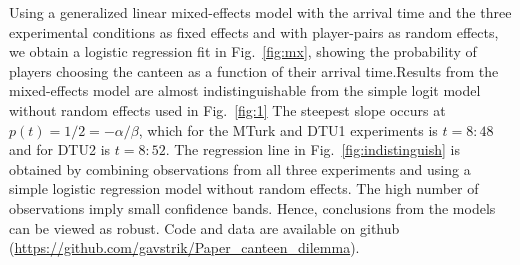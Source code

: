 \documentclass[twocolumn,a4paper,superscriptaddress,nofootinbib]{revtex4}
\begin{document}
Using a generalized linear mixed-effects model with the arrival time and the three experimental conditions as fixed effects and with player-pairs as random effects, we obtain a logistic regression fit in Fig.~\ref{fig:mx}, showing the probability of players choosing the canteen as a function of their arrival time.Results from the mixed-effects  model are almost indistinguishable from the simple logit model without random effects used in Fig.~\ref{fig:1} The steepest slope occurs at $p(t) = 1/2 = -\alpha/\beta$, which for the MTurk and DTU1 experiments is $t=8{:}48$ and for DTU2 is $t=8{:}52$. The regression line in Fig.~\ref{fig:indistinguish} is obtained by combining observations from all three experiments and using a simple logistic regression model without random effects. The high number of observations imply small confidence bands. Hence, conclusions from the models can be viewed as robust. Code and data are available on github (\url{https://github.com/gavstrik/Paper_canteen_dilemma}).
\end{document}
